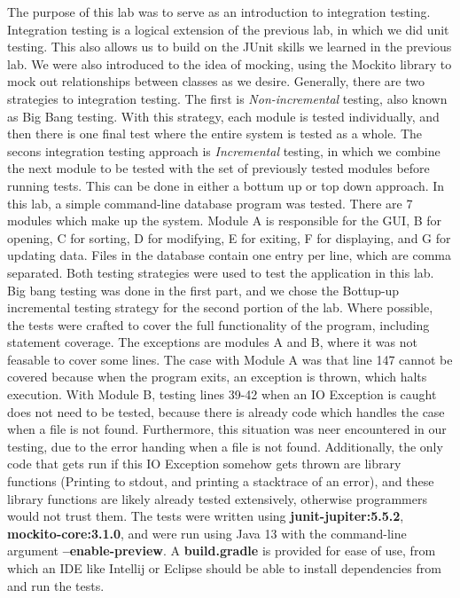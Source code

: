 The purpose of this lab was to serve as an introduction to integration testing.
Integration testing is a logical extension of the previous lab, in which we did
unit testing. This also allows us to build on the JUnit skills we learned in the
previous lab. We were also introduced to the idea of mocking, using the Mockito
library to mock out relationships between classes as we desire. Generally, there
are two strategies to integration testing. The first is \textit{Non-incremental}
testing, also known as Big Bang testing. With this strategy, each module is
tested individually, and then there is one final test where the entire system is
tested as a whole. The secons integration testing approach is
\textit{Incremental} testing, in which we combine the next module to be tested
with the set of previously tested modules before running tests. This can be done
in either a bottum up or top down approach. In this lab, a simple command-line
database program was tested. There are 7 modules which make up the system.
Module A is responsible for the GUI, B for opening, C for sorting, D for
modifying, E for exiting, F for displaying, and G for updating data. Files in
the database contain one entry per line, which are comma separated. Both testing
strategies were used to test the application in this lab. Big bang testing was
done in the first part, and we chose the Bottup-up incremental testing strategy
for the second portion of the lab. Where possible, the tests were crafted to
cover the full functionality of the program, including statement coverage. The
exceptions are modules A and B, where it was not feasable to cover some lines.
The case with Module A was that line 147 cannot be covered because when the
program exits, an exception is thrown, which halts execution. With Module B,
testing lines 39-42 when an IO Exception is caught does not need to be tested,
because there is already code which handles the case when a file is not found.
Furthermore, this situation was neer encountered in our testing, due to the
error handing when a file is not found. Additionally, the only code that gets
run if this IO Exception somehow gets thrown are library functions (Printing to
stdout, and printing a stacktrace of an error), and these library functions are
likely already tested extensively, otherwise programmers would not trust them. 
The tests were written using \textbf{junit-jupiter:5.5.2},
\textbf{mockito-core:3.1.0}, and were run using Java 13 with the command-line
argument \textbf{--enable-preview}. A \textbf{build.gradle} is provided for ease
of use, from which an IDE like Intellij or Eclipse should be able to install
dependencies from and run the tests.
